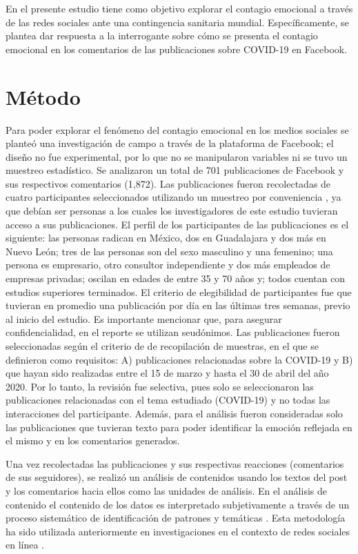 \documentclass[spanish]{textolivre}
\begin{document}
En el presente estudio tiene como objetivo explorar el contagio emocional a través de las redes sociales ante una contingencia sanitaria mundial. Específicamente, se plantea dar respuesta a la interrogante sobre cómo se presenta el contagio emocional en los comentarios de las publicaciones sobre COVID-19 en Facebook. 


\section{Método}
Para poder explorar el fenómeno del contagio emocional en los medios sociales se planteó una investigación de campo a través de la plataforma de Facebook; el diseño no fue experimental, por lo que no se manipularon variables ni se tuvo un muestreo estadístico.  Se analizaron un total de 701 publicaciones de Facebook y sus respectivos comentarios (1,872). Las publicaciones fueron recolectadas de cuatro participantes seleccionados utilizando un muestreo por conveniencia \cite{creswell2018}, ya que debían ser personas a los cuales los investigadores de este estudio tuvieran acceso a sus publicaciones. El perfil de los participantes de las publicaciones es el siguiente: las personas radican en México, dos en Guadalajara y dos más en Nuevo León; tres de las personas son del sexo masculino y una femenino; una persona es empresario, otro consultor independiente y dos más empleados de empresas privadas; oscilan en edades de entre 35 y 70 años y; todos cuentan con estudios superiores terminados. El criterio de elegibilidad de participantes fue que tuvieran en promedio una publicación por día en las últimas tres semanas, previo al inicio del estudio. Es importante mencionar que, para asegurar confidencialidad, en el reporte se utilizan seudónimos. Las publicaciones fueron seleccionadas según el criterio de \textcite{creswell2018} de recopilación de muestras, en el que se definieron como requisitos: A) publicaciones relacionadas sobre la COVID-19 y B) que hayan sido realizadas entre el 15 de marzo y hasta el 30 de abril del año 2020. Por lo tanto, la revisión fue selectiva, pues solo se seleccionaron las publicaciones relacionadas con el tema estudiado (COVID-19) y no todas las interacciones del participante. Además, para el análisis fueron consideradas solo las publicaciones que tuvieran texto para poder identificar la emoción reflejada en el mismo y en los comentarios generados.

Una vez recolectadas las publicaciones y sus respectivas reacciones (comentarios de sus seguidores), se realizó un análisis de contenidos usando los textos del post y los comentarios hacia ellos como las unidades de análisis. En el análisis de contenido el contenido de los datos es interpretado subjetivamente a través de un proceso sistemático de identificación de patrones y temáticas \cite{hsieh2005}. Esta metodología ha sido utilizada anteriormente en investigaciones en el contexto de redes sociales en línea \cite{woolley2010,hum2011,parsons2013,valerioUrea2015}.
\end{document}
